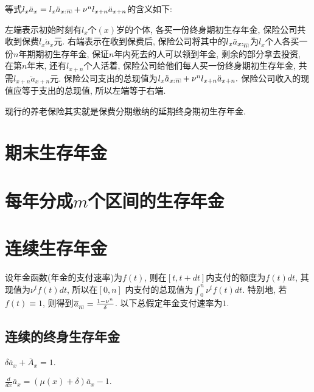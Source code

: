 \documentclass[lang=cn,10pt]{elegantbook}
\makeatletter
\DeclareRobustCommand{\annu}[1]{_{%
    \def\arraystretch{0}%
    \setlength\arraycolsep{1pt}%
    \setlength\arrayrulewidth{.2pt}%
    \begin{array}[b]{@{}c|}\hline
        \\[\arraycolsep]%
        \scriptstyle #1%
    \end{array}%
}}
\makeatother
\begin{document}
\begin{remark}
    等式$l_{x}\ddot a_{x}=l_{x}\ddot a_{x:}{}\annu n+\nu^{n}l_{x+n}\ddot a_{x+n}$的含义如下: 
    
    左端表示初始时刻有$l_x$个$(x)$岁的个体, 各买一份终身期初生存年金, 保险公司共收到保费$l_{x}\ddot a_{x}$元. 右端表示在收到保费后, 保险公司将其中的$l_{x}\ddot a_{x:\annu n}$为$l_x$个人各买一份$n$年期期初生存年金, 保证$n$年内死去的人可以领到年金, 剩余的部分拿去投资, 在第$n$年末, 还有$l_{x+n}$个人活着, 保险公司给他们每人买一份终身期初生存年金, 共需$l_{x+n}\ddot a_{x+n}$元. 保险公司支出的总现值为$l_{x}\ddot a_{x:}{}\annu n+\nu^{n}l_{x+n}\ddot a_{x+n}.$ 保险公司收入的现值应等于支出的总现值, 所以左端等于右端.

    现行的养老保险其实就是保费分期缴纳的延期终身期初生存年金.
\end{remark}

\section{期末生存年金}
\section{每年分成$m$个区间的生存年金}

\section{连续生存年金}
\begin{definition}[连续年金]
    设年金函数(年金的支付速率)为$f(t)$, 则在$[t,t+dt]$内支付的额度为$f(t)dt$, 其现值为$\nu^tf(t)dt$, 所以在$[0,n]$ 内支付的总现值为$\int_0^n \nu^tf(t)dt$. 特别地, 若$f(t) \equiv 1$, 则得到$\overline{a}_{\annu n} = \frac{1-\nu^n}{\delta}$.
以下总假定年金支付速率为$1.$
\end{definition}

\subsection{连续的终身生存年金}
\begin{corollary}
    $\delta \overline{a}_x + \overline{A}_x = 1$.
\end{corollary}

\begin{proposition}
    $\frac{d}{dx}\overline{a}_x = (\mu(x)+\delta)\overline{a}_x-1.$
\end{proposition}
\end{document}
